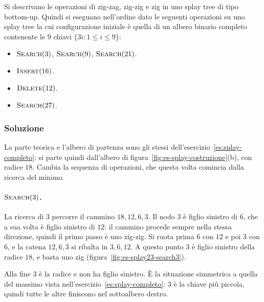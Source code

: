 \begin{esercizio}\label{es:splay-2023}
Si descrivano le operazioni di zig-zag, zig-zig e zig in uno splay tree di tipo bottom-up. Quindi si eseguano nell'ordine dato le seguenti operazioni su uno splay tree la cui configurazione iniziale è quella di un albero binario completo contenente le $9$ chiavi $\{3i : 1 \le i \le 9\}$:
\begin{itemize}
    \item $\textsc{Search}(3)$, $\textsc{Search}(9)$, $\textsc{Search}(21)$.
    \item $\textsc{Insert}(16)$.
    \item $\textsc{Delete}(12)$.
    \item $\textsc{Search}(27)$.
\end{itemize}
\end{esercizio}

\subsubsection*{Soluzione}
La parte teorica e l'albero di partenza sono gli stessi dell'esercizio~\ref{es:splay-completo}: si parte quindi dall'albero di figura~\ref{fig:es-splay-costruzione}(b), con radice $18$. Cambia la sequenza di operazioni, che questa volta comincia dalla ricerca del minimo.

\paragraph{$\textsc{Search}(3)$.}
La ricerca di $3$ percorre il cammino $18, 12, 6, 3$. Il nodo $3$ è figlio sinistro di $6$, che a sua volta è figlio sinistro di $12$: il cammino procede sempre nella stessa direzione, quindi il primo passo è uno zig-zig. Si ruota prima $6$ con $12$ e poi $3$ con $6$, e la catena $12, 6, 3$ si ribalta in $3, 6, 12$. A questo punto $3$ è figlio sinistro della radice $18$, e basta uno zig (figura~\ref{fig:es-splay23-search3}).

Alla fine $3$ è la radice e non ha figlio sinistro. È la situazione simmetrica a quella del massimo vista nell'esercizio~\ref{es:splay-completo}: $3$ è la chiave più piccola, quindi tutte le altre finiscono nel sottoalbero destro.

